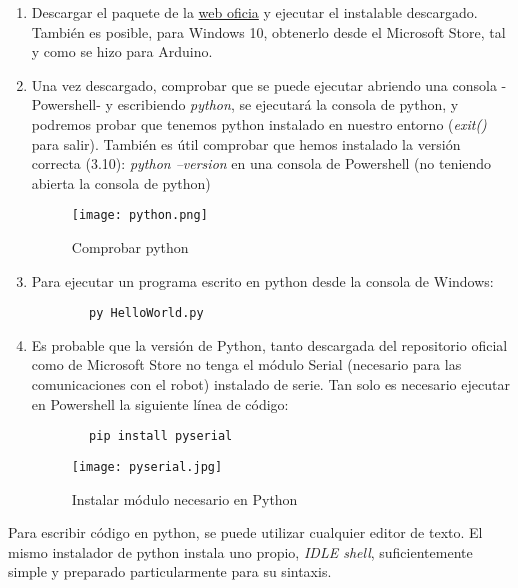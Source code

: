 \begin{enumerate}\label{list:instalacionPython}
	\item Descargar el paquete de la \href{https://www.python.org/downloads/}{web oficia} y ejecutar el instalable descargado.
	También es posible, para Windows 10, obtenerlo desde el Microsoft Store, tal y como se hizo para Arduino.
	\item Una vez descargado, comprobar que se puede ejecutar abriendo una consola -Powershell- y escribiendo \textit{python},	se ejecutará la consola de python, y podremos probar que tenemos python instalado en nuestro entorno (\textit{exit()} para salir). También es útil comprobar que hemos instalado la versión correcta (3.10): \textit{python --version} en una consola de Powershell (no teniendo abierta la consola de python)
	\begin{figure}[h]
		\texttt{[image: python.png]}
		\centering
		\label{img:python}
		\caption{Comprobar python}
	\end{figure}
	\item Para ejecutar un programa escrito en python desde la consola de Windows: 
	\begin{verbatim}
		py HelloWorld.py
	\end{verbatim}
	\item Es probable que la versión de Python, tanto descargada del repositorio oficial como de Microsoft Store no tenga el módulo Serial (necesario para las comunicaciones con el robot) instalado de serie. Tan solo es necesario ejecutar en Powershell la siguiente línea de código:
	\begin{verbatim}
		pip install pyserial
	\end{verbatim}
	\begin{figure}[h]
		\texttt{[image: pyserial.jpg]}
		\centering
		\label{img:pyserial}
		\caption{Instalar módulo necesario en Python}
	\end{figure}
\end{enumerate}
\newpage
Para escribir código en python, se puede utilizar cualquier editor de texto. El mismo instalador de python instala uno propio, \textit{IDLE shell}, suficientemente simple y preparado particularmente para su sintaxis.
